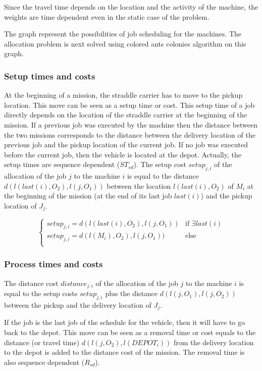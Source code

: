 \documentclass[a4paper,10pt]{article}
\begin{document}
Since the travel time depends on the location and the activity of the machine, the weights are time dependent even in the static case of the problem.

The graph represent the possibilities of job scheduling for the machines. The allocation problem is next solved using colored ants colonies algorithm on this graph.


\subsubsection{Setup times and costs}

At the beginning of a mission, the straddle carrier has to move to the pickup location. This move can be seen as a setup time or cost. This setup time of a job directly depends on the location of the straddle carrier at the beginning of the mission. If a previous job was executed by the machine then the distance between the two missions corresponds to the distance between the delivery location of the previous job and the pickup location of the current job. If no job was executed before the current job, then the vehicle is located at the depot. Actually, the setup times are sequence dependent ($ST_{sd}$).
The setup cost $setup_{j, i}$ of the allocation of the job $j$ to the machine $i$ is equal to the distance $d(l(last(i),O_2),l(j,O_1))$ between the location $l(last(i),O_2)$ of $M_i$ at the beginning of the mission (at the end of its last job $last(i)$) and the pickup location of $J_j$.

\begin{equation*}
 \begin{cases}
  setup_{j, i} = d(l(last(i),O_2),l(j,O_1)) & \text{if $\exists last(i)$}\\
  setup_{j, i} = d(l(M_i),O_2),l(j,O_1)) & \text{else}\\
 \end{cases}
\end{equation*}

\subsubsection{Process times and costs}

The distance cost $distance_{j, i}$ of the allocation of the job $j$ to the machine $i$ is equal to the setup costs $setup_{j, i}$ plus the distance $d(l(j,O_1), l(j,O_2))$ between the pickup and the delivery location of $J_j$.

If the job is the last job of the schedule for the vehicle, then it will have to go back to the depot. This move can be seen as a removal time or cost equals to the distance (or travel time) $d(l(j,O_2),l(DEPOT_{i}))$ from the delivery location to the depot is added to the distance cost of the mission. The removal time is also sequence dependent ($R_{sd}$).
\end{document}

